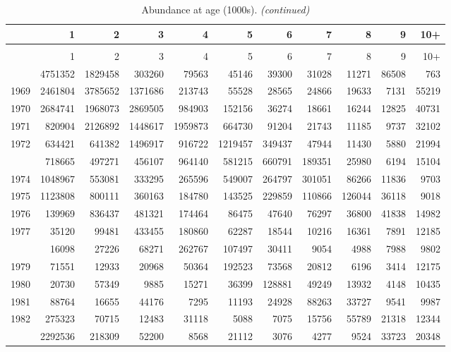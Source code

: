 \documentclass[
]{article}
\begin{document}
\begin{longtable}[t]{lrrrrrrrrrr}
\caption{\label{tab:NAA-table}Abundance at age (1000s).}\\
\toprule
  & 1 & 2 & 3 & 4 & 5 & 6 & 7 & 8 & 9 & 10+\\
\midrule
\endfirsthead
\caption[]{Abundance at age (1000s). \textit{(continued)}}\\
\toprule
  & 1 & 2 & 3 & 4 & 5 & 6 & 7 & 8 & 9 & 10+\\
\midrule
\endhead

\endfoot
\bottomrule
\endlastfoot
1968 & 4751352 & 1829458 & 303260 & 79563 & 45146 & 39300 & 31028 & 11271 & 86508 & 763\\
1969 & 2461804 & 3785652 & 1371686 & 213743 & 55528 & 28565 & 24866 & 19633 & 7131 & 55219\\
1970 & 2684741 & 1968073 & 2869505 & 984903 & 152156 & 36274 & 18661 & 16244 & 12825 & 40731\\
1971 & 820904 & 2126892 & 1448617 & 1959873 & 664730 & 91204 & 21743 & 11185 & 9737 & 32102\\
1972 & 634421 & 641382 & 1496917 & 916722 & 1219457 & 349437 & 47944 & 11430 & 5880 & 21994\\
\addlinespace
1973 & 718665 & 497271 & 456107 & 964140 & 581215 & 660791 & 189351 & 25980 & 6194 & 15104\\
1974 & 1048967 & 553081 & 333295 & 265596 & 549007 & 264797 & 301051 & 86266 & 11836 & 9703\\
1975 & 1123808 & 800111 & 360163 & 184780 & 143525 & 229859 & 110866 & 126044 & 36118 & 9018\\
1976 & 139969 & 836437 & 481321 & 174464 & 86475 & 47640 & 76297 & 36800 & 41838 & 14982\\
1977 & 35120 & 99481 & 433455 & 180860 & 62287 & 18544 & 10216 & 16361 & 7891 & 12185\\
\addlinespace
1978 & 16098 & 27226 & 68271 & 262767 & 107497 & 30411 & 9054 & 4988 & 7988 & 9802\\
1979 & 71551 & 12933 & 20968 & 50364 & 192523 & 73568 & 20812 & 6196 & 3414 & 12175\\
1980 & 20730 & 57349 & 9885 & 15271 & 36399 & 128881 & 49249 & 13932 & 4148 & 10435\\
1981 & 88764 & 16655 & 44176 & 7295 & 11193 & 24928 & 88263 & 33727 & 9541 & 9987\\
1982 & 275323 & 70715 & 12483 & 31118 & 5088 & 7075 & 15756 & 55789 & 21318 & 12344\\
\addlinespace
1983 & 2292536 & 218309 & 52200 & 8568 & 21112 & 3076 & 4277 & 9524 & 33723 & 20348\\

\end{longtable}
\end{document}
